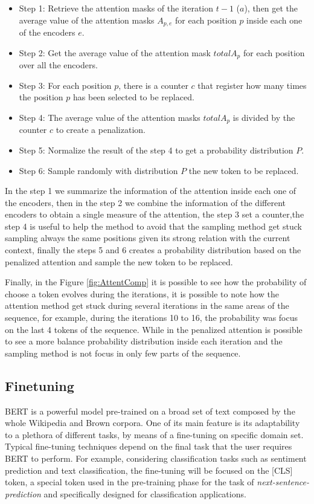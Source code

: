\documentclass[10pt,twocolumn,letterpaper]{article}
\begin{document}
\begin{itemize}
\item Step 1: Retrieve the attention masks of the iteration $t-1$ ($a$), then get the average value of the attention masks $A_{p,e}$ for each position $p$ inside each one of the encoders $e$.
\item Step 2: Get the average value of the attention mask $totalA_{p}$ for each position over all the encoders.
\item Step 3: For each position $p$, there is a counter $c$ that register how many times the position $p$ has been selected to be replaced.
\item Step 4: The average value of the attention masks $totalA_{p}$ is divided by the counter $c$ to create a penalization.
\item Step 5: Normalize the result of the step 4 to get a probability distribution $P$.
\item Step 6: Sample randomly with distribution $P$ the new token to be replaced.
\end{itemize}

In the step 1 we summarize the information of the attention inside each one of the encoders,
then in the step 2 we combine the information of the different encoders to obtain a single
measure of the attention, the step 3 set a counter,the step 4 is useful to help the method to avoid that the sampling
method get stuck sampling always the same positions given its strong relation with the current
context, finally the steps 5 and 6 creates a probability distribution based on the penalized attention
and sample the new token to be replaced.

Finally, in the Figure \ref{fig:AttentComp} it is possible to see how the probability of choose a token evolves
during the iterations, it is possible to note how the attention method
get stuck during several iterations in the same areas of the sequence, for example, during the iterations
10 to 16, the probability was focus on the last 4 tokens of the sequence.
While in the penalized attention is possible to see a more balance probability distribution inside each iteration
and the sampling method is not focus in only few parts of the sequence.
\subsection{Finetuning}
BERT is a powerful model pre-trained on a broad set of text composed by the whole
Wikipedia and Brown corpora.
One of its main feature is its adaptability to a plethora of different tasks,
by means of a fine-tuning on specific domain set.
Typical fine-tuning techniques depend on the final task that the user requires BERT to perform.
For example, considering classification tasks such as sentiment prediction and text classification,
the fine-tuning will be focused on the [CLS] token, a special token used in the pre-training phase for the task
of \textit{next-sentence-prediction} and specifically designed for classification applications.
\end{document}
